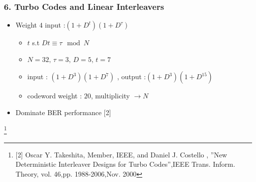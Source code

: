 \documentclass{beamer}  %
\newcommand\blfootnote[1]{%
  \begingroup
  \renewcommand\thefootnote{}\footnote{#1}%
  \addtocounter{footnote}{-1}%
  \endgroup
}
\begin{document}

\begin{frame}
\frametitle{6.  Turbo Codes and Linear Interleavers}
\begin{itemize}
\item Weight $4$ input :$ (1+D^t)(1+D^{\tau})$

\begin{itemize}
\item $t$ s.t $Dt \equiv \tau \mod N$
\end{itemize}
\begin{example}
\begin{itemize}
\item  $N=32,\, \tau=3, \, D=5,\, t=7$

\item input : $(1+D^3)(1+D^7)$  , output :$(1+ D^3)(1+D^{15})$

\item codeword weight : $20$, multiplicity $\rightarrow N$
\end{itemize}



\end{example}
\item Dominate BER performance [2]

\end{itemize}
\blfootnote {[2] Oscar Y. Takeshita, Member, IEEE, and Daniel J. Costello ,
''New Deterministic Interleaver Designs for Turbo Codes'',IEEE Trans. Inform. 
Theory, vol.  46,pp. 1988-2006,Nov. 2000}
\end{frame}










\end{document}
